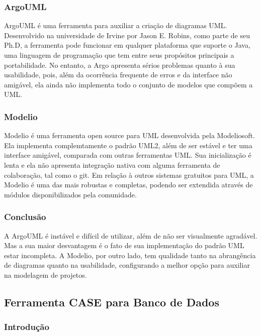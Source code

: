 \documentclass[12pt,a4paper]{article}
\begin{document}
		\subsubsection{ArgoUML}
		
			ArgoUML é uma ferramenta para auxiliar a criação de diagramas UML. Desenvolvido
			na universidade de Irvine por Jason E. Robins, como parte de seu Ph.D, a ferramenta
			pode funcionar em qualquer plataforma que suporte o Java, uma linguagem de 
			programação que tem entre seus propósitos principais a portabilidade.
			No entanto, a Argo apresenta sérios problemas quanto à sua usabilidade, pois,
			além da ocorrência frequente de erros e da interface não amigável, ela ainda não
			implementa todo o conjunto de modelos que compõem a UML.
			
		\subsubsection{Modelio}
		
			Modelio é uma ferramenta open source para UML desenvolvida pela Modeliosoft.
			Ela implementa complemtamente o padrão UML2, além de ser estável e ter uma interface
			amigável, comparada com outras ferramentas UML. Sua inicialização é lenta e ela não
			apresenta integração nativa com alguma ferramenta de colaboração, tal como o git.
			Em relação à outros sistemas gratuitos para UML, a Modelio é uma das mais robustas
			e completas, podendo ser extendida através de módulos disponibilizados pela comunidade.
		\subsubsection{Conclusão}
			A ArgoUML é instável e difícil de utilizar, além de não ser visualmente agradável. Mas
			a sua maior desvantagem é o fato de sua implementação do padrão UML estar incompleta.
			A Modelio, por outro lado, tem qualidade tanto na abrangência de diagramas quanto
			na usabilidade, configurando a melhor opção para auxiliar na modelagem de projetos.

	\clearpage
	\subsection{Ferramenta CASE para Banco de Dados}
	
		\subsubsection{Introdução}
		
\end{document}
